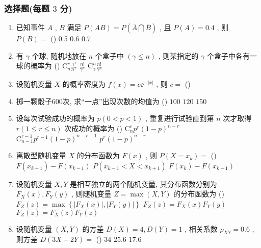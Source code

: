 \subsubsection{选择题(每题 $3$ 分)}
\begin{enumerate}
	\item 已知事件 $A$ , $B$ 满足 $P(AB)=P\left( \overline{A}\bigcap\overline{B} \right)$ , 且 $P(A)=0.4$ , 则 $P(B)=$ (\hspace{1pc})
	{0.5}
	{0.6}
	{0.7}

	\item 有 $\gamma$ 个球, 随机地放在 $n$ 个盒子中 $(\gamma \leq n)$ , 则某指定的 $\gamma$ 个盒子中各有一球的概率为 (\hspace{1pc})
	{$\mathrm{C}_n^r\frac{\gamma !}{n^\gamma}$}
	{$\frac{n!}{\gamma^n}$}
	{$\mathrm{C}_\gamma^n\frac{n!}{\gamma^n}$}

	\item 设随机变量 $X$ 的概率密度为 $f(x)=c\ee^{-\left|x\right|}$ , 则 $c=$ (\hspace{1pc})

	\item 掷一颗骰子$600$次, 求“一点”出现次数的均值为 (\hspace{1pc})
	{$100$}
	{$120$}
	{$150$}

	\item 设每次试验成功的概率为 $p (0<p<1)$ , 重复进行试验直到第 $n$ 次才取得 $r (1\leq r\leq n)$ 次成功的概率为 (\hspace{1pc})
	{$\mathrm{C}_{n}^{r}p^r(1-p)^{n-r}$}
	{$\mathrm{C}_{n-1}^{r-1}p^{r-1}(1-p)^{n-r+1}$}
	{$p^r(1-p)^{n-r}$}

	\item 离散型随机变量 $X$ 的分布函数为 $F(x)$ , 则 $P(X=x_k)=$ (\hspace{1pc})
	{$F(x_{k+1})-F(x_{k-1})$}
	{$P(x_{k-1}<X<x_{k+1})$}
	{$F(x_{k})-F(x_{k-1})$}

	\item 设随机变量 $X, Y$ 是相互独立的两个随机变量, 其分布函数分别为 $F_X(x), F_Y(y)$ , 则随机变量 $Z=\max (X,Y)$ 的分布函数为 (\hspace{1pc})
	{$F_Z(z)=\max\left\{\left|F_X(x)\right|,\left|F_Y(y)\right|\right\}$}
	{$F_Z(z)=F_X(x)F_Y(y)$}
	{$F_Z(z)=F_X(z)F_Y(z)$}

	\item 设随机变量 $(X, Y)$ 的方差 $D(X)=4, D(Y)=1$ , 相关系数 $\rho_{XY}=0.6$ , 则方差 $D(3X-2Y)=$ (\hspace{1pc})
	{$34$}
	{$25.6$}
	{$17.6$}


\end{enumerate}
